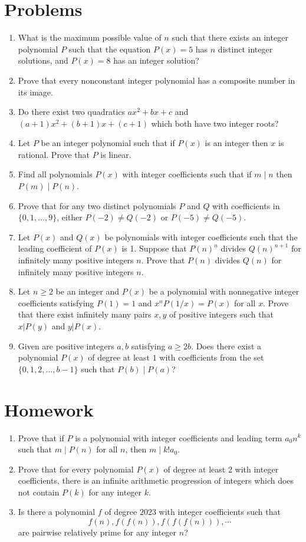 \documentclass{article}
\begin{document}
\section{Problems}
\begin{enumerate}
  \item What is the maximum possible value of $n$ such that there exists an
    integer polynomial $P$ such that the equation $P(x)=5$ has $n$
    distinct integer solutions, and $P(x)=8$ has an integer solution?
  \item Prove that every nonconstant integer polynomial has a composite number
    in its image.
  \item Do there exist two quadratics $ax^2+bx+c$ and $(a+1)x^2+(b+1)x+(c+1)$
    which both have two integer roots?
  \item Let $P$ be an integer polynomial such that if $P(x)$ is an integer then
    $x$ is rational. Prove that $P$ is linear.
  \item Find all polynomials $P(x)$ with integer coefficients such that if
    $m\mid n$ then $P(m)\mid P(n)$.
  \item Prove that for any two distinct polynomials $P$ and $Q$ with coefficients in
    $\{0,1,\ldots,9\}$, either $P(-2)\ne Q(-2)$ or $P(-5)\ne Q(-5)$.
  \item Let $P(x)$ and $Q(x)$ be polynomials with integer coefficients such that the
    leading coefficient of $P(x)$ is 1. Suppose that $P(n)^n$ divides $Q(n)^{n+1}$ for infinitely
    many positive integers $n$.
    Prove that $P(n)$ divides $Q(n)$ for infinitely many positive integers $n$.
  \item Let $n\ge 2$ be an integer and
    $P(x)$ be a polynomial with nonnegative integer coefficients satisfying
    $P(1)=1$ and $x^n P(1/x)=P(x)$ for all $x$.
    Prove that there exist infinitely many
    pairs $x, y$ of positive integers such that $x|P(y)$ and $y|P(x)$.
  \item  Given are positive integers $a, b$ satisfying $a \geq 2b$. Does there
    exist a polynomial $P(x)$ of degree at least $1$ with coefficients from the
    set $\{0, 1, 2, \ldots, b-1 \}$ such that $P(b) \mid P(a)$?
\end{enumerate}
\newpage
\section{Homework}
\begin{enumerate}
  \item Prove that if $P$ is a polynomial with integer coefficients and leading term $a_0n^k$ such
    that $m\mid P(n)$ for all $n$, then $m\mid k!a_0$.
  \item Prove that for every polynomial $P(x)$ of degree at least 2 with integer
    coefficients, there is an infinite arithmetic
    progression of integers which does not contain $P(k)$ for any integer $k$.
  \item Is there a polynomial $f$ of degree $2023$ with integer
    coefficients such that \[f(n), f(f(n)), f(f(f(n))), \cdots\] are pairwise
    relatively prime for any integer $n$?
\end{enumerate}
\end{document}
